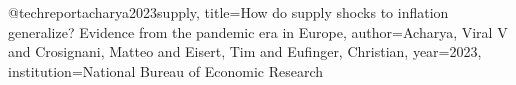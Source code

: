 @techreport{acharya2023supply,
	title={How do supply shocks to inflation generalize? Evidence from the pandemic era in Europe},
	author={Acharya, Viral V and Crosignani, Matteo and Eisert, Tim and Eufinger, Christian},
	year={2023},
	institution={National Bureau of Economic Research}
}
